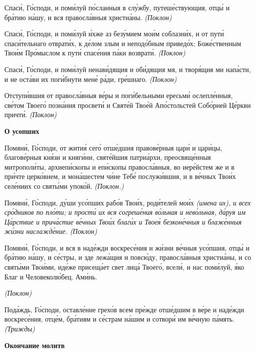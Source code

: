    Спаси́, Го́споди, и поми́луй по́сланныя в слу́жбу, путеше́ствующия, отцы́
и бра́тию на́шу, и вся правосла́вныя христиа́ны. \itshape (Поклон)\normalfont{}


   Спаси́, Го́споди, и поми́луй и́хже аз безу́мием мои́м соблазни́х, и от
пути́ спаси́тельнаго отврати́х, к де́лом злым и неподо́бным приведо́х;
Боже́ственным Твои́м Про́мыслом к пути́ спасе́ния па́ки возврати́.
\itshape (Поклон)\normalfont{}


   Спаси́, Го́споди, и поми́луй ненави́дящия и оби́дящия мя, и творя́щия ми
напа́сти, и не оста́ви их поги́бнути мене́ ра́ди, гре́шнаго. \itshape (Поклон)\normalfont{}


   Отступи́вшия от правосла́вныя ве́ры и поги́бельными ересьми́
ослепле́нныя, све́том Твоего́ позна́ния просвети́ и Святе́й Твое́й Апо́стольстей
Собо́рней Це́ркви причти́. \itshape (Поклон)\normalfont{}



 

\bfseries О усопших\normalfont{}


   Помяни́, Го́споди, от жития́ сего́ отше́дшия правове́рныя цари́ и цари́цы,
благове́рныя кня́зи и княги́ни, святе́йшия патриа́рхи, преосвяще́нныя
митрополи́ты, архиепи́скопы и епи́скопы правосла́вныя, во иере́йстем же и в
при́чте церко́внем, и мона́шестем чи́не Тебе́ послужи́вшия, и в ве́чных Твои́х
селе́ниих со святы́ми упоко́й. \itshape (Поклон.)\normalfont{}


   Помяни́, Го́споди, ду́ши усо́пших рабо́в Твои́х, роди́телей мои́х \itshape (имена
их)\normalfont{}, и всех сро́дников по пло́ти; и прости́ их вся согреше́ния во́льная и
нево́льная, да́руя им Ца́рствие и прича́стие ве́чных Твои́х благи́х и Твоея́
безконе́чныя и блаже́нныя жи́зни наслажде́ние. \itshape (Поклон)\normalfont{}


   Помяни́, Го́споди, и вся в наде́жди воскресе́ния и жи́зни ве́чныя
усо́пшия, отцы́ и бра́тию на́шу, и се́стры, и зде лежа́щия и повсю́ду,
правосла́вныя христиа́ны, и со святы́ми Твои́ми, иде́же присеща́ет свет лица́
Твоего́, всели́, и нас поми́луй, я́ко Благ и Человеколю́бец. Ами́нь.

\itshape (Поклон)\normalfont{}


   Пода́ждь, Го́споди, оставле́ние грехо́в всем пре́жде отше́дшим в ве́ре и
наде́жди воскресе́ния, отце́м, бра́тиям и се́страм на́шим и сотвори́ им ве́чную
па́мять. \itshape (Трижды)\normalfont{}



 

\bfseries Окончание молитв\normalfont{}


